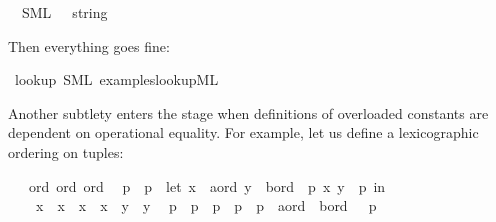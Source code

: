 \begin{isabellebody}
\ \ {\isacharparenleft}SML\ {\isachardoublequoteopen}{\isacharbang}{\isacharparenleft}{\isacharparenleft}{\isacharunderscore}\ {\isacharcolon}\ string{\isacharparenright}\ {\isacharequal}\ {\isacharunderscore}{\isacharparenright}{\isachardoublequoteclose}{\isacharparenright}%
\endisatagtt
{\isafoldtt}%
%
\isadelimtt
%
\endisadelimtt
%
\begin{isamarkuptext}%
Then everything goes fine:%
\end{isamarkuptext}%
\isamarkuptrue%
\isamarkupfalse%
\ lookup\ {\isacharparenleft}SML\ {\isachardoublequoteopen}examples{\isacharslash}lookup{\isachardot}ML{\isachardoublequoteclose}{\isacharparenright}%
\begin{isamarkuptext}%
%
\end{isamarkuptext}%
\isamarkuptrue%
%
\isamarkuptrue%
%
\begin{isamarkuptext}%
Another subtlety
  enters the stage when definitions of overloaded constants
  are dependent on operational equality.  For example, let
  us define a lexicographic ordering on tuples:%
\end{isamarkuptext}%
\isamarkuptrue%
%
\isadelimML
%
\endisadelimML
%
\isatagML
%
\endisatagML
{\isafoldML}%
%
\isadelimML
%
\endisadelimML
\isanewline
{}\isamarkupfalse%
\ {\isacharasterisk}\ {\isacharcolon}{\isacharcolon}\ {\isacharparenleft}ord{\isacharcomma}\ ord{\isacharparenright}\ ord\isanewline
\ \ {\isachardoublequoteopen}p{}\ {\isacharless}\ p{}\ {\isasymequiv}\ let\ {\isacharparenleft}x{}\ {\isasymColon}\ {\isacharprime}a{\isasymColon}ord{\isacharcomma}\ y{}\ {\isasymColon}\ {\isacharprime}b{\isasymColon}ord{\isacharparenright}\ {\isacharequal}\ p{}{\isacharsemicolon}\ {\isacharparenleft}x{}{\isacharcomma}\ y{}{\isacharparenright}\ {\isacharequal}\ p{}\ in\isanewline
\ \ \ \ x{}\ {\isacharless}\ x{}\ {\isasymor}\ {\isacharparenleft}x{}\ {\isacharequal}\ x{}\ {\isasymand}\ y{}\ {\isacharless}\ y{}{\isacharparenright}{\isachardoublequoteclose}\isanewline
\ \ {\isachardoublequoteopen}p{}\ {\isasymle}\ p{}\ {\isasymequiv}\ p{}\ {\isacharless}\ p{}\ {\isasymor}\ {\isacharparenleft}p{}\ {\isasymColon}\ {\isacharprime}a{\isasymColon}ord\ {\isasymtimes}\ {\isacharprime}b{\isasymColon}ord{\isacharparenright}\ \ {\isacharequal}\ p{}{\isachardoublequoteclose}%

\end{isabellebody}
